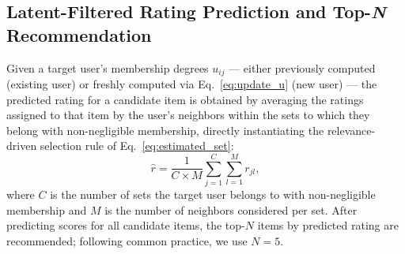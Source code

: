 \documentclass{article}
\begin{document}
\subsection{Latent-Filtered Rating Prediction and Top-\textit{N} Recommendation}
\label{subsec:rating_prediction}

Given a target user's membership degrees $u_{ij}$ — either previously computed (existing user) or freshly computed via Eq.~\eqref{eq:update_u} (new user) — the predicted rating for a candidate item is obtained by averaging the ratings assigned to that item by the user's neighbors within the sets to which they belong with non-negligible membership, directly instantiating the relevance-driven selection rule of Eq.~\eqref{eq:estimated_set}:
\begin{equation}
	\label{eq:avgrating}
	\hat{r} = \frac{1}{C \times M} \sum_{j=1}^{C} \sum_{l=1}^{M} r_{jl},
\end{equation}
where $C$ is the number of sets the target user belongs to with non-negligible membership and $M$ is the number of neighbors considered per set. After predicting scores for all candidate items, the top-$N$ items by predicted rating are recommended; following common practice, we use $N = 5$.
\end{document}
